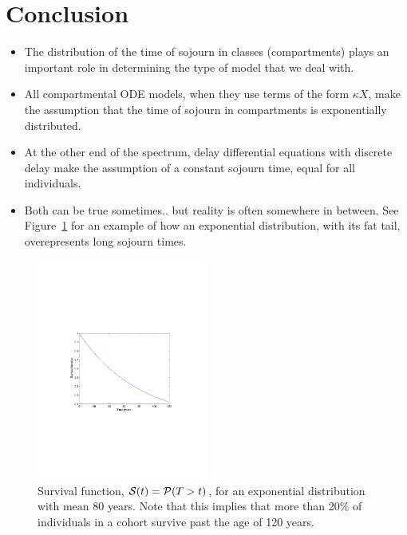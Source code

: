 \section{Conclusion}
\begin{itemize}
\item The distribution of the time of sojourn in classes (compartments) plays an important role in determining the type of model that we deal with.
\item All compartmental ODE models, when they use terms of the form $\kappa X$, make the assumption that the time of sojourn in compartments is exponentially distributed.
\item At the other end of the spectrum, delay differential equations with discrete delay make the assumption of a constant sojourn time, equal for all individuals.
\item Both can be true sometimes.. but reality is often somewhere in between. See Figure~\ref{fig:exp_distrib_80years} for an example of how an exponential distribution, with its fat tail, overepresents long sojourn times.
\end{itemize}

\begin{figure}[htbp]
\begin{center}
\includegraphics[width=0.5\textwidth]
{../figs_03_residence_time/survival_exp_80years}
\caption{Survival function, $\mathcal{S}(t)=\mathcal{P}(T>t)$, for an exponential distribution with mean 80 years. Note that this implies that more than 20\% of individuals in a cohort survive past the age of 120 years.}
\label{fig:exp_distrib_80years}
\end{center}
\end{figure}

